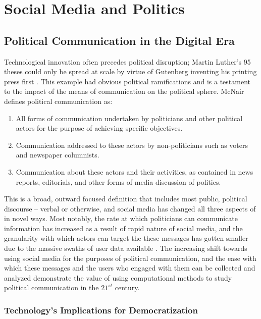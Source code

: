 \chapter{Social Media and Politics}\label{ch:SMandPolitics}

\section{Political Communication in the Digital Era}

Technological innovation often precedes political disruption; Martin Luther’s 95
theses could only be spread at scale by virtue of Gutenberg inventing his
printing press first \cite{gardels2019renovating}. This example had obvious
political ramifications and is a testament to the impact of the means of
communication on the political sphere. McNair defines political communication
as:

\begin{enumerate}    
    \item All forms of communication undertaken by politicians and other
    political actors for the purpose of achieving specific objectives.
    \item Communication addressed to these actors by non-politicians such as
    voters and newspaper columnists.
    \item Communication about these actors and their activities, as contained in news reports, editorials, and other forms of media discussion of politics. \cite{mcnair2017introduction}
\end{enumerate} 

This is a broad, outward focused definition that includes most public, political
discourse -- verbal or otherwise, and social media has changed all three aspects
of in novel ways. Most notably, the rate at which politicians can communicate
information has increased as a result of rapid nature of social media, and the
granularity with which actors can target the these messages has gotten smaller
due to the massive swaths of user data available \cite{nickerson2014political}.
The increasing shift towards using social media for the purposes of political
communication, and the ease with which these messages and the users who engaged
with them can be collected and analyzed demonstrate the value of using
computational methods to study political communication in the $21^{st}$ century.

\subsection{Technology's Implications for Democratization}


